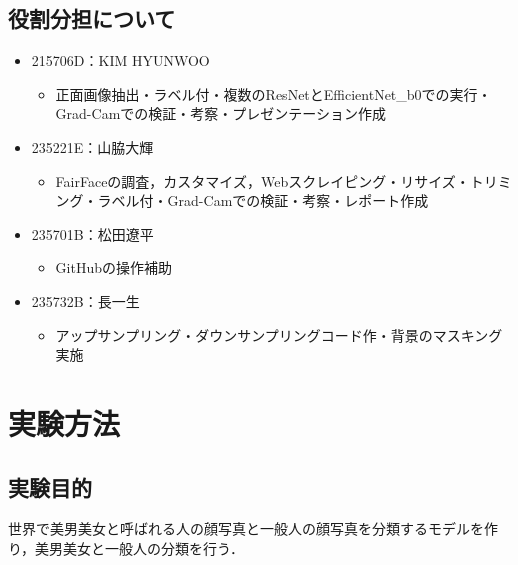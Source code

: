 \documentclass[a4paper,11pt,titlepage]{jsarticle}
\begin{document}
\subsection{役割分担について}
\begin{itemize}
    \item 215706D：KIM HYUNWOO
        \begin{itemize}
            \item 正面画像抽出・ラベル付・複数のResNetとEfficientNet\_b0での実行・Grad-Camでの検証・考察・プレゼンテーション作成
        \end{itemize}
    \item 235221E：山脇大輝
        \begin{itemize}
            \item FairFaceの調査，カスタマイズ，Webスクレイピング・リサイズ・トリミング・ラベル付・Grad-Camでの検証・考察・レポート作成
        \end{itemize}
    \item 235701B：松田遼平
        \begin{itemize}
            \item GitHubの操作補助
        \end{itemize}
    \item 235732B：長一生
        \begin{itemize}
            \item アップサンプリング・ダウンサンプリングコード作・背景のマスキング実施
        \end{itemize}
\end{itemize}



\section{実験方法}
\label{label:実験方法}
\subsection{実験目的}
世界で美男美女と呼ばれる人の顔写真と一般人の顔写真を分類するモデルを作り，美男美女と一般人の分類を行う．
\end{document}
